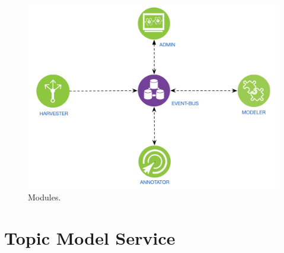 \begin{figure}
  \includegraphics[scale=0.25]{modules}
  \caption{Modules.}
  \label{fig:librairy-modules}
\end{figure}



\section{Topic Model Service}

 






